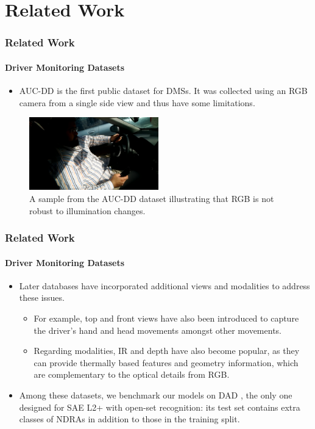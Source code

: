 \section{Related Work}

\begin{frame}
\frametitle{Related Work}
\framesubtitle{Driver Monitoring Datasets}

\begin{itemize}
    \item AUC-DD \cite{abouelnaga2018real} is the first public dataset for DMSs. It was collected using an RGB camera from a single side view and thus have some limitations.
\end{itemize}

\begin{figure}
    \centering
    \includegraphics[width=0.5\textwidth]{images/auc-dd.jpg}
    \caption{A sample from the AUC-DD dataset \cite{abouelnaga2018real} illustrating that RGB is not robust to illumination changes.}
    \label{fig:3}
\end{figure}

\end{frame}

\begin{frame}
\frametitle{Related Work}
\framesubtitle{Driver Monitoring Datasets}

\begin{itemize}
    \item Later databases \cite{martin2019drive, ortega2020dmd, jegham2020novel, kopuklu2021driver} have incorporated additional views and modalities to address these issues.
        \begin{itemize}
            \item For example, top and front views have also been introduced to capture the driver's hand and head movements amongst other movements. 
            \item Regarding modalities, IR and depth have also become popular, as they can provide thermally based features and geometry information, which are complementary to the optical details from RGB.
        \end{itemize}
    \item Among these datasets, we benchmark our models on DAD \cite{kopuklu2021driver}, the only one designed for SAE L2+ with open-set recognition: its test set contains extra classes of NDRAs in addition to those in the training split.
\end{itemize}

\end{frame}

